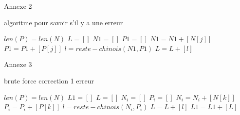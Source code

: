 \documentclass[a4paper, 11pt]{report}
\begin{document}
\newpage

\begin{appendices}
    Annexe 2
    \begin{algorithm}
        \caption{algoritme pour savoir s'il y a une erreur}
        \begin{algorithmic}
            \REQUIRE $len(P)=len(N)$
            \STATE $L=[]$
            \STATE $N1=[]$
            \STATE $P1=[]$
            \STATE $N1=N1+[N[j]]$
            \STATE $P1=P1+[P[j]]$
            \ENDIF
            \ENDFOR
            \STATE $l=reste-chinois(N1,P1)$
            \STATE $L=L+[l]$
            \ENDFOR
        \end{algorithmic}
    \end{algorithm}
\end{appendices}

\newpage

\begin{appendices}
    Annexe 3
    \begin{algorithm}
        \caption{brute force correction 1 erreur}
        \begin{algorithmic}
            \REQUIRE $len(P)=len(N)$
            \STATE $L1=[]$
            \STATE $L=[]$
            \STATE $N_i=[]$
            \STATE $P_i=[]$
            \STATE $N_i=N_i+[N[k]]$
            \STATE $P_i=P_i+[P[k]]$
            \ENDIF
            \ENDFOR
            \STATE $l=reste-chinois(N_i,P_i)$
            \STATE $L=L+[l]$
            \ENDFOR
            \STATE $L1=L1+[L]$
            \ENDFOR
        \end{algorithmic}
    \end{algorithm}
\end{appendices}

\newpage
\end{document}
